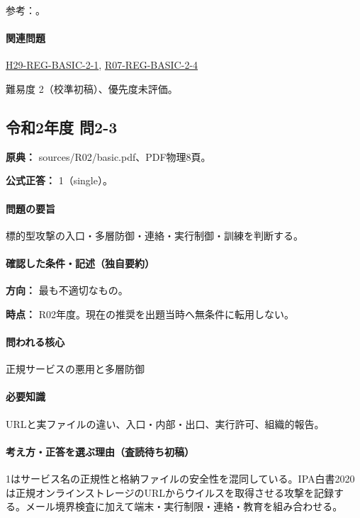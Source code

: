 \par 参考：\cite{net_target2020,net_ipa_account}。

\paragraph{関連問題} \hyperref[q:h29-reg-basic-2-1]{H29-REG-BASIC-2-1}, \hyperref[q:r07-reg-basic-2-4]{R07-REG-BASIC-2-4}

\par 難易度 2（校準初稿）、優先度未評価。

\subsection{令和2年度 問2-3}
\label{q:r02-reg-basic-2-3}

\noindent\textbf{原典：} sources/R02/basic.pdf、PDF物理8頁。

\textbf{公式正答：} 1（single）。

\paragraph{問題の要旨} 標的型攻撃の入口・多層防御・連絡・実行制御・訓練を判断する。

\paragraph{確認した条件・記述（独自要約）}\mbox{}\par

\noindent\textbf{方向：} 最も不適切なもの。\par

\noindent\textbf{時点：} R02年度。現在の推奨を出題当時へ無条件に転用しない。\par

\paragraph{問われる核心} 正規サービスの悪用と多層防御

\paragraph{必要知識} URLと実ファイルの違い、入口・内部・出口、実行許可、組織的報告。

\paragraph{考え方・正答を選ぶ理由（査読待ち初稿）} 1はサービス名の正規性と格納ファイルの安全性を混同している。IPA白書2020は正規オンラインストレージのURLからウイルスを取得させる攻撃を記録する。メール境界検査に加えて端末・実行制限・連絡・教育を組み合わせる。

